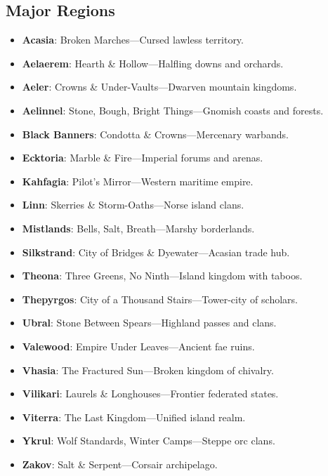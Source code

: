 \documentclass[11pt,twoside]{article}
\begin{document}
\subsection{Major Regions}
\begin{multicols}{2}
\begin{itemize}[leftmargin=*]
    \item \textbf{Acasia}: Broken Marches—Cursed lawless territory.
    \item \textbf{Aelaerem}: Hearth \& Hollow—Halfling downs and orchards.
    \item \textbf{Aeler}: Crowns \& Under-Vaults—Dwarven mountain kingdoms.
    \item \textbf{Aelinnel}: Stone, Bough, Bright Things—Gnomish coasts and forests.
    \item \textbf{Black Banners}: Condotta \& Crowns—Mercenary warbands.
    \item \textbf{Ecktoria}: Marble \& Fire—Imperial forums and arenas.
    \item \textbf{Kahfagia}: Pilot's Mirror—Western maritime empire.
    \item \textbf{Linn}: Skerries \& Storm-Oaths—Norse island clans.
    \item \textbf{Mistlands}: Bells, Salt, Breath—Marshy borderlands.
    \item \textbf{Silkstrand}: City of Bridges \& Dyewater—Acasian trade hub.
    \item \textbf{Theona}: Three Greens, No Ninth—Island kingdom with taboos.
    \item \textbf{Thepyrgos}: City of a Thousand Stairs—Tower-city of scholars.
    \item \textbf{Ubral}: Stone Between Spears—Highland passes and clans.
    \item \textbf{Valewood}: Empire Under Leaves—Ancient fae ruins.
    \item \textbf{Vhasia}: The Fractured Sun—Broken kingdom of chivalry.
    \item \textbf{Vilikari}: Laurels \& Longhouses—Frontier federated states.
    \item \textbf{Viterra}: The Last Kingdom—Unified island realm.
    \item \textbf{Ykrul}: Wolf Standards, Winter Camps—Steppe orc clans.
    \item \textbf{Zakov}: Salt \& Serpent—Corsair archipelago.
\end{itemize}
\end{multicols}
\end{document}
